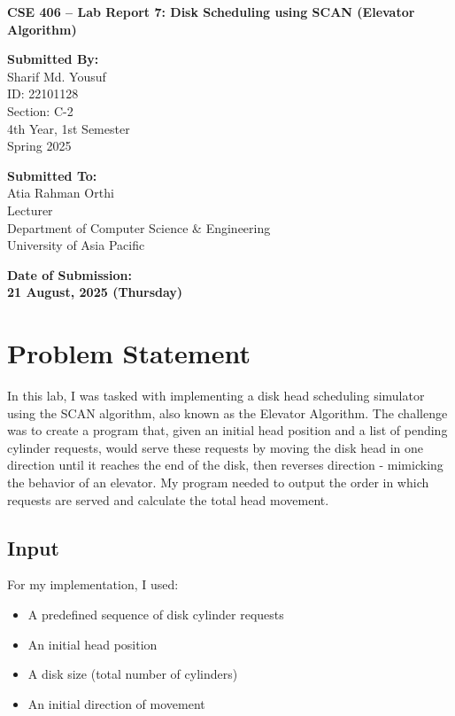 \documentclass[12pt,a4paper]{article}
\begin{document}
\begin{titlepage}
  \centering
  \vspace*{3cm}

  {\Huge\bfseries CSE 406 – Lab Report 7: Disk Scheduling using SCAN (Elevator Algorithm) \par}
  \vspace{2.5cm}

  \noindent
  \begin{minipage}[t]{0.48\textwidth}
    {\large\bfseries Submitted By:}\\[0.5em]
    \Large
    Sharif Md. Yousuf \\
    ID: 22101128 \\
    Section: C-2 \\
    4th Year, 1st Semester \\
    Spring 2025
  \end{minipage}
  \hfill
  \begin{minipage}[t]{0.48\textwidth}
    {\large\bfseries Submitted To:}\\[0.5em]
    \Large
    Atia Rahman Orthi \\
    Lecturer \\
    Department of Computer Science \& Engineering \\
    University of Asia Pacific
  \end{minipage}

  \vfill

  {\Large\bfseries Date of Submission:} \\[0.5em]
  {\LARGE\bfseries 21 August, 2025 (Thursday)}

  \vspace*{2cm}
\end{titlepage}

\section{Problem Statement}
In this lab, I was tasked with implementing a disk head scheduling simulator using the SCAN algorithm, also known as the Elevator Algorithm. The challenge was to create a program that, given an initial head position and a list of pending cylinder requests, would serve these requests by moving the disk head in one direction until it reaches the end of the disk, then reverses direction - mimicking the behavior of an elevator. My program needed to output the order in which requests are served and calculate the total head movement.

\subsection*{Input}
For my implementation, I used:
\begin{itemize}
  \item A predefined sequence of disk cylinder requests
  \item An initial head position
  \item A disk size (total number of cylinders)
  \item An initial direction of movement
\end{itemize}
\end{document}
